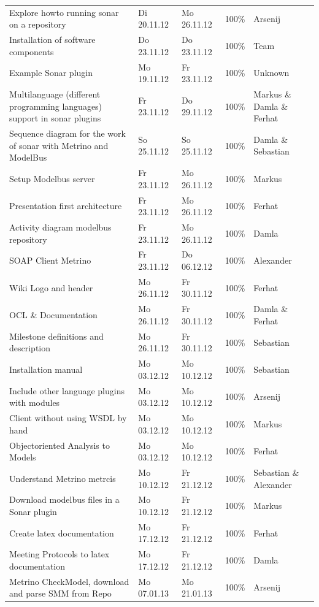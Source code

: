 \begin{longtable}{|p{6cm}|p{2.5cm}|p{2.5cm}|p{1.7cm}|p{1.8cm}|}
Explore howto running sonar on a repository & Di 20.11.12 & Mo 26.11.12 & 100\% & Arsenij \\ 
Installation of software components & Do 23.11.12 & Do 23.11.12 & 100\% & Team \\ 
Example Sonar plugin & Mo 19.11.12 & Fr 23.11.12 & 100\%     & Unknown                 \\ 
Multilanguage (different programming languages) support in sonar plugins & Fr 23.11.12 & Do 29.11.12 & 100\%     & Markus  \&  Damla  \&  Ferhat \\
Sequence diagram for the work of sonar with Metrino and ModelBus & So 25.11.12 & So 25.11.12 & 100\%     & Damla \& Sebastian \\ 
Setup Modelbus server & Fr 23.11.12 & Mo 26.11.12 & 100\%& Markus \\ 
Presentation first architecture & Fr 23.11.12 & Mo 26.11.12 & 100\% & Ferhat \\ 
Activity diagram modelbus repository & Fr 23.11.12 & Mo 26.11.12 & 100\% & Damla \\ 
SOAP Client Metrino & Fr 23.11.12 & Do 06.12.12 & 100\% & Alexander \\ 
Wiki Logo and header & Mo 26.11.12 & Fr 30.11.12 & 100\% & Ferhat \\ 
OCL  \&  Documentation & Mo 26.11.12 & Fr 30.11.12 & 100\% & Damla \&  Ferhat \\ 
Milestone definitions and description & Mo 26.11.12 & Fr 30.11.12 & 100\% & Sebastian \\ 
Installation manual & Mo 03.12.12 & Mo 10.12.12 & 100\% & Sebastian \\ 
Include other language plugins with modules & Mo 03.12.12 & Mo 10.12.12 & 100\% & Arsenij \\
Client without using WSDL by hand & Mo 03.12.12 & Mo 10.12.12 & 100\% & Markus \\ 
Objectoriented Analysis to Models & Mo 03.12.12 & Mo 10.12.12 & 100\% & Ferhat \\ 
Understand Metrino metrcis & Mo 10.12.12 & Fr 21.12.12 & 100\% & Sebastian  \&  Alexander \\ 
Download modelbus files in a Sonar plugin & Mo 10.12.12 & Fr 21.12.12 & 100\% & Markus \\ 
Create latex documentation & Mo 17.12.12 & Fr 21.12.12 & 100\% & Ferhat \\ 
Meeting Protocols to latex documentation & Mo 17.12.12 & Fr 21.12.12 & 100\% & Damla \\ 
Metrino CheckModel, download and parse SMM from Repo & Mo 07.01.13 & Mo 21.01.13 & 100\% & Arsenij \\ 

\end{longtable}
